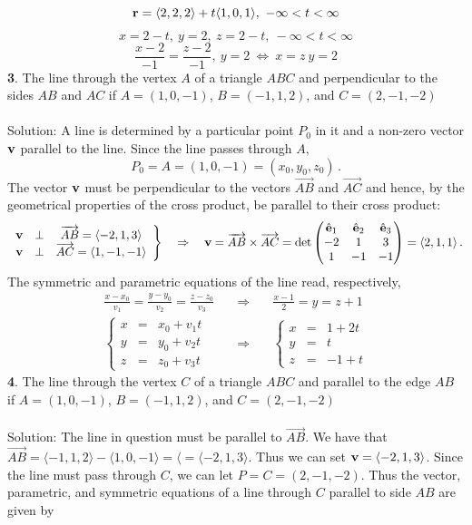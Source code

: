 \documentclass[12pt]{amsbook}
\newcommand{\la}{\langle}
\newcommand{\ra}{\rangle}
\begin{document}
  $${\bf r} = \la 2,2,2\ra +t\la 1,0,1\ra, \ -\infty<t<\infty$$
 $$x=2-t, \ y=2, \ z=2-t, \ -\infty<t<\infty$$
 $$\frac{x-2}{-1}= \frac{z-2}{-1}, \ y=2 \ \Leftrightarrow \ x=z \ y=2 $$
{\small\bf 3}. The line through the vertex $A$ of a triangle $ABC$
and perpendicular to the sides $AB$ and $AC$ if $A=(1,0,-1)$, $B=(-1,1,2)$,
and $C=(2,-1,-2)$  \\
\\
{\sc Solution}: A line is determined by a particular point $P_0$ in it and 
a non-zero vector ${\bf v}$ parallel to the line. Since the line passes 
through $A$, 
$$
P_0=A=(1,0,-1)=(x_0,y_0,z_0)\,.
$$ 
The vector ${\bf v}$ must be 
perpendicular to the vectors $\overrightarrow{AB}$ and $\overrightarrow{AC}$
and hence, by the geometrical properties of the cross product, be parallel
to their cross product:
$$
\left.
\begin{array}{ccc}
{\bf v}&\perp& \overrightarrow{AB}=\la -2,1,3\ra\\
{\bf v}&\perp& \overrightarrow{AC}=\la 1,-1,-1\ra 
\end{array}\right\}\quad\Rightarrow\quad
{\bf v}=\overrightarrow{AB}\times\overrightarrow{AC}=
\det\begin{pmatrix}\hat{\bf e}_1&\hat{\bf e}_2&
\hat{\bf e}_3\cr -2&1&3\cr 1&-1&-1\end{pmatrix}=\la 2, 1,1\ra\,.
$$
The symmetric and parametric equations of the line read, respectively,
\begin{eqnarray*}
\frac{x-x_0}{v_1}=\frac{y-y_0}{v_2}=\frac{z-z_0}{v_3}\quad&\Rightarrow&\quad
\frac{x-1}{2}=y=z+1\,\\
\left\{
\begin{array}{rcl}
x&=&x_0+v_1t\\
y&=&y_0+v_2t\\
z&=&z_0+v_3t
\end{array}\right.\quad&\Rightarrow&\quad
\left\{
\begin{array}{rcl}
x&=&1+2t\\
y&=&t\\
z&=&-1+t
\end{array}\right.
\end{eqnarray*} 
{\small\bf 4}. The line through the vertex $C$ of a triangle $ABC$
and parallel to the edge $AB$ if $A=(1,0,-1)$, $B=(-1,1,2)$,
and $C=(2,-1,-2)$  \\
\\
{\sc Solution}: The line in question must be parallel to $\overrightarrow{AB}$. We have that $\overrightarrow{AB}=\la -1,1,2\ra - \la 1,0,-1\ra= \la =\la -2, 1, 3 \ra$. Thus we can set ${\bf v}=\la -2,1,3 \ra$. Since the line must pass through $C$, we can let $P=C=(2,-1,-2)$. Thus the vector, parametric, and symmetric equations of a line through $C$ parallel to side $AB$ are given by
\end{document}
